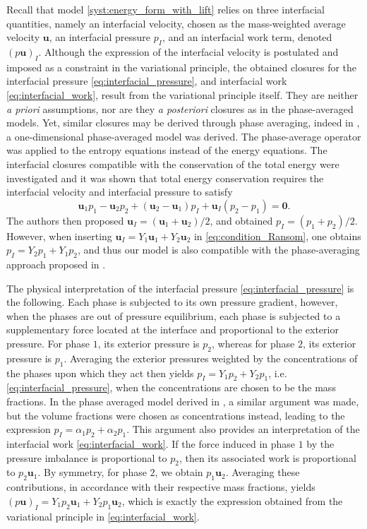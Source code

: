 \documentclass{myclass}
\newcommand{\vel}{\bm{u}}
\begin{document}
Recall that model \eqref{syst:energy_form_with_lift} relies on three interfacial quantities, namely an interfacial velocity, chosen as the mass-weighted average velocity $\vel$, an interfacial pressure $p_I$, and an interfacial work term, denoted $(p\vel)_I$. Although the expression of the interfacial velocity is postulated and imposed as a constraint in the variational principle, the obtained closures for the interfacial pressure \eqref{eq:interfacial_pressure}, and interfacial work \eqref{eq:interfacial_work}, result from the variational principle itself. They are neither \textit{a priori} assumptions, nor are they \textit{a posteriori} closures as in the phase-averaged models. Yet, similar closures may be derived through phase averaging, indeed in \cite{ransom:1984}, a one-dimensional phase-averaged model was derived. The phase-average operator was applied to the entropy equations instead of the energy equations. The interfacial closures compatible with the conservation of the total energy were investigated and it was shown that total energy conservation requires the interfacial velocity and interfacial pressure to satisfy
\begin{equation}\label{eq:condition_Ransom}
\vel_1 p_1 - \vel_2 p_2 + (\vel_2-\vel_1)p_I + \vel_I(p_2-p_1)=\bm{0}.
\end{equation}
The authors then proposed $\vel_I=(\vel_1 + \vel_2)/2$, and obtained $p_I=(p_1 + p_2)/2$. However, when inserting $\vel_I=Y_1\vel_1 + Y_2\vel_2$ in \eqref{eq:condition_Ransom}, one obtains $p_I = Y_2 p_1 + Y_1 p_2$, and thus our model is also compatible with the phase-averaging approach proposed in \cite{ransom:1984}. 

The physical interpretation of the interfacial pressure \eqref{eq:interfacial_pressure} is the following. Each phase is subjected to its own pressure gradient, however, when the phases are out of pressure equilibrium, each phase is subjected to a supplementary force located at the interface and proportional to the exterior pressure. For phase $1$, its exterior pressure is $p_2$, whereas for phase $2$, its exterior pressure is $p_1$. Averaging the exterior pressures weighted by the concentrations of the phases upon which they act then yields $p_I = Y_1 p_2 + Y_2 p_1$, i.e. \eqref{eq:interfacial_pressure}, when the concentrations are chosen to be the mass fractions. In the phase averaged model derived in \cite{chen:1996}, a similar argument was made, but the volume fractions were chosen as concentrations instead, leading to the expression $p_I=\alpha_1 p_2 + \alpha_2 p_1$. This argument also provides an interpretation of the interfacial work \eqref{eq:interfacial_work}. If the force induced in phase $1$ by the pressure imbalance is proportional to $p_2$, then its associated work is proportional to $p_2\vel_1$. By symmetry, for phase $2$, we obtain $p_1\vel_2$. Averaging these contributions, in accordance with their respective mass fractions, yields $(p\vel)_I = Y_1 p_2\vel_1 + Y_2 p_1 \vel_2$, which is exactly the expression obtained from the variational principle in \eqref{eq:interfacial_work}.
\end{document}
